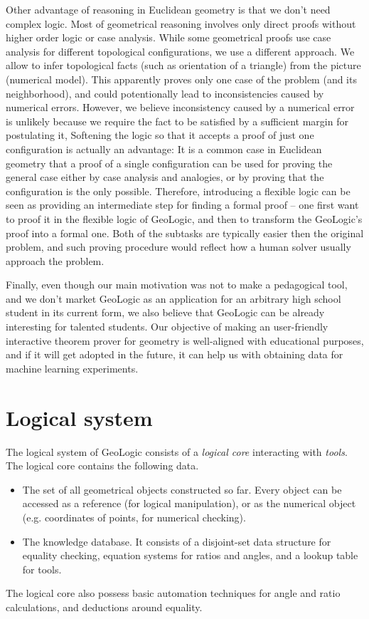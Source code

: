 \documentclass[runningheads]{llncs}
\begin{document}
Other advantage of reasoning in Euclidean geometry is that we don't
need complex logic. Most of geometrical reasoning involves only direct
proofs without higher order logic or case analysis. While some
geometrical proofs use case analysis for different topological
configurations, we use a different approach. We allow to infer
topological facts (such as orientation of a triangle) from the picture
(numerical model). This apparently proves only one case of the problem
(and its neighborhood), and could potentionally lead to
inconsistencies caused by numerical errors. However, we believe
inconsistency caused by a numerical error is unlikely because we
require the fact to be satisfied by a sufficient margin for postulating it,
Softening the logic so that it accepts a proof of just one
configuration is actually an advantage: It is a common case in
Euclidean geometry that a proof of a single configuration can be used
for proving the general case either by case analysis and analogies, or
by proving that the configuration is the only possible. Therefore,
introducing a flexible logic can be seen as providing an intermediate
step for finding a formal proof -- one first want to proof it in the
flexible logic of GeoLogic, and then to transform the GeoLogic's proof
into a formal one. Both of the subtasks are typically easier then the
original problem, and such proving procedure would reflect how a human
solver usually approach the problem.

Finally, even though our main motivation was not to make a pedagogical
tool, and we don't market GeoLogic as an application for an arbitrary
high school student in its current form, we also believe that GeoLogic
can be already interesting for talented students.
Our objective of making an user-friendly interactive theorem
prover for geometry is well-aligned with educational purposes, and if
it will get adopted in the future, it can help us with obtaining
data for machine learning experiments.

\section{Logical system}

The logical system of GeoLogic consists of a
\emph{logical core} interacting with \emph{tools}.
The logical core contains the following data.
\begin{itemize}
\item The set of all geometrical objects constructed so far. Every
  object can be accessed as a reference (for logical manipulation), or
  as the numerical object (e.g. coordinates of points, for numerical
  checking).
\item The knowledge database. It consists of a disjoint-set data
structure for equality checking, equation systems for ratios and
angles, and a lookup table for tools.
\end{itemize}
The logical core also possess basic automation techniques for angle and
ratio calculations, and deductions around equality.
\end{document}
